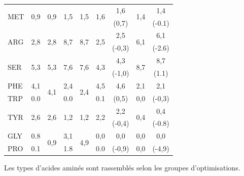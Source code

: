 \begin{table}
\begin{tabular}{lcccc|cccc}
\hline                                                                        
\multirow{2}{*}{MET}&\multirow{2}{*}{0,9}&\multirow{2}{*}{0,9}&\multirow{2}{*}{1,5}&\multirow{2}{*}{1,5}&\multirow{2}{*}{1,6}&1,6&\multirow{2}{*}{1,4}&1,4\\
&&&&&&(0,7)&&(-0.1)\\
\hline                                                                         
\multirow{2}{*}{ARG}&\multirow{2}{*}{2,8}&\multirow{2}{*}{2,8}&\multirow{2}{*}{8,7}&\multirow{2}{*}{8,7}&\multirow{2}{*}{2,5}&2,5&\multirow{2}{*}{6,1}&6,1\\
&&&&&&(-0,3)&&(-2.6)\\
\hline                                                                                  
\multirow{2}{*}{SER} &\multirow{2}{*}{5,3}&\multirow{2}{*}{5,3}&\multirow{2}{*}{7,6}&\multirow{2}{*}{7,6}&\multirow{2}{*}{4,3}&4,3&\multirow{2}{*}{8,7}&8,7\\
&&&&&&(-1,0)&&(1.1)\\
\hline                                                         
PHE      &4,1&\multirow{2}{*}{4,1}&2,4&\multirow{2}{*}{2,4}&4,5&\multirow{1}{*}{4,6}&2,1&\multirow{1}{*}{2,1}\\
TRP&0.0&&0.0&&0.1&(0,5)&0,0&(-0,3)\\
\hline                                                                                                                                                                                   
\multirow{2}{*}{TYR}&\multirow{2}{*}{2,6}&\multirow{2}{*}{2,6}&\multirow{2}{*}{1,2}&\multirow{2}{*}{1,2}&\multirow{2}{*}{2,2}&2,2&\multirow{2}{*}{0,4}&0,4\\
&&&&&&(-0,4)&&(-0.8)\\
\hline                                                                                                                                                                            
GLY&0.8&\multirow{2}{*}{0,9}&3,1&\multirow{2}{*}{4,9}&0,0&\multirow{1}{*}{0,0}&0,0&\multirow{1}{*}{0,0}\\
PRO&0.1&&1.8&&0.0&(-0,9)&0,0&(-4,9)\\
\hline
\end{tabular}
{\footnotesize Les types d'acides aminés sont rassemblés selon les groupes d'optimisations.}
\label{Tab:FreqAA6}
\end{table}



